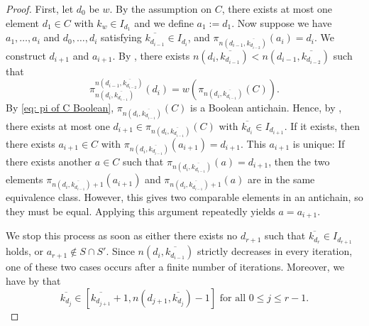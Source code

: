 \documentclass{preprint}
\theoremstyle{definition}
\begin{document}
\begin{proof}
    First, let $d_0$ be $w$. By the assumption on $C$, there exists at most one element $d_1 \in C$ with $k_w \in I_{d_1}$ and we define $a_1:=d_1$.
    Now suppose we have $a_1, \dots, a_{i}$ and $d_0, \dots, d_{i}$ satisfying $\overline{k_{d_{i-1}}}\in I_{d_{i}}$, and $\pi_{n(d_{i-1}, \overline{k_{d_{i-2}}})}(a_{i}) = d_{i}$.
    We construct $d_{i+1}$ and $a_{i+1}$. By , there exists $n(d_i,\overline{k_{d_{i-1}}}) < n(d_{i-1},\overline{k_{d_{i-2}}})$ such that \[\pi_{n(d_i, \overline{k_{d_{i-1}}})}^{n(d_{i-1}, \overline{k_{d_{i-2}}})}(d_i) = w(\pi_{n(d_{i}, \overline{k_{d_{i-1}}})}(C)).\]
    By \eqref{eq: pi of C Boolean}, $\pi_{n(d_i,\overline{k_{d_{i-1}}})}(C)$ is a Boolean antichain. Hence, by , there exists at most one $d_{i+1} \in \pi_{n(d_i,\overline{k_{d_{i-1}}})}(C)$ with $\overline{k_{d_i}} \in I_{d_{i+1}}$. If it exists, then there exists $a_{i+1} \in C$ with $\pi_{n(d_i, \overline{k_{d_{i-1}}})}(a_{i+1}) = d_{i+1}$. This $a_{i+1}$ is unique: If there exists another $a \in C$ such that $\pi_{n(d_i, \overline{k_{d_{i-1}}})}(a) = d_{i+1}$, then the two elements $\pi_{n(d_i, \overline{k_{d_{i-1}}})+1}(a_{i+1})$ and $\pi_{n(d_i, \overline{k_{d_{i-1}}})+1}(a)$ are in the same equivalence class. However, this gives two comparable elements in an antichain, so they must be equal. Applying this argument repeatedly yields $a = a_{i+1}$.
    
    We stop this process as soon as either there exists no $d_{r+1}$ such that $\overline{k_{d_r}} \in I_{d_{r+1}}$ holds, or $a_{r+1} \notin S \cap S'$. Since $n(d_i,\overline{k_{d_{i-1}}})$ strictly decreases in every iteration, one of these two cases occurs after a finite number of iterations.  
    Moreover, we have by  that
    \begin{equation}\label{eq: k_d_j}
        \overline{k_{d_j}} \in [\overline{k_{d_{j+1}}}+1,n(d_{j+1},\overline{k_{d_j}})-1] \text{ for all } 0 \leq j \leq r-1.
    \end{equation}


\end{proof}
\end{document}
